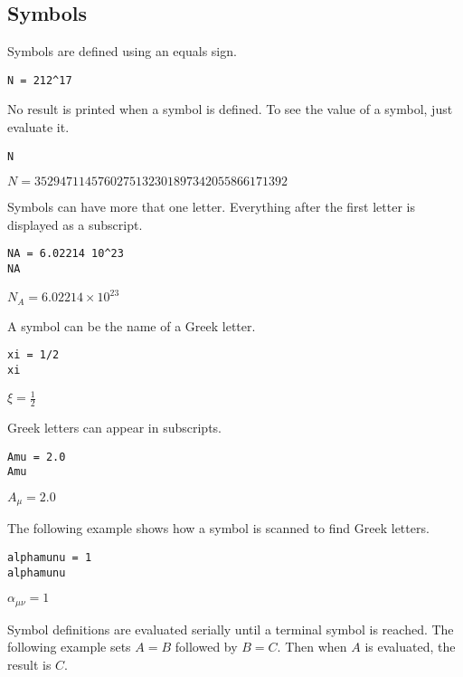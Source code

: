 \subsection{Symbols}

Symbols are defined using an equals sign.

{\color{blue}
\begin{verbatim}
N = 212^17
\end{verbatim}
}

\noindent
No result is printed when a symbol is defined.
To see the value of a symbol, just evaluate it.

{\color{blue}
\begin{verbatim}
N
\end{verbatim}
}

\noindent
$\displaystyle N=3529471145760275132301897342055866171392$

\bigskip
\noindent
Symbols can have more that one letter.
Everything after the first letter is displayed as a subscript.

{\color{blue}
\begin{verbatim}
NA = 6.02214 10^23
NA
\end{verbatim}
}

\noindent
$\displaystyle N_A=6.02214\times10^{23}$

\bigskip
\noindent
A symbol can be the name of a Greek letter.

{\color{blue}
\begin{verbatim}
xi = 1/2
xi
\end{verbatim}
}

\noindent
$\displaystyle \xi=\tfrac{1}{2}$

\bigskip
\noindent
Greek letters can appear in subscripts.

{\color{blue}
\begin{verbatim}
Amu = 2.0
Amu
\end{verbatim}
}

\noindent
$\displaystyle A_\mu=2.0$

\bigskip
\noindent
The following example shows how a symbol is scanned to find Greek letters.

{\color{blue}
\begin{verbatim}
alphamunu = 1
alphamunu
\end{verbatim}
}

\noindent
$\displaystyle \alpha_{\mu\nu}=1$

\bigskip
\noindent
Symbol definitions are evaluated serially until a terminal symbol is reached.
The following example sets $A=B$ followed by $B=C$.
Then when $A$ is evaluated, the result is $C$.

